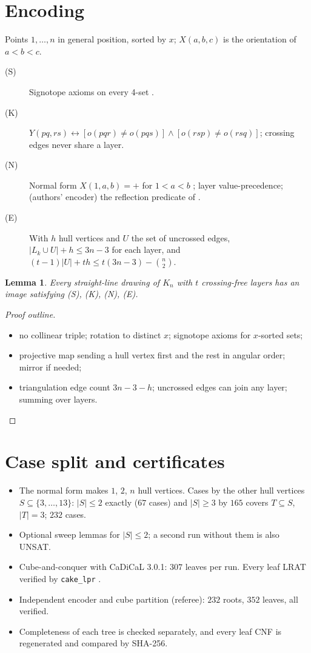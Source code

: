 \documentclass[11pt]{article}
\newtheorem{lemma}[theorem]{Lemma}
\begin{document}
\section{Encoding}
Points $1,\dots,n$ in general position, sorted by $x$; $X(a,b,c)$ is the orientation of $a<b<c$.
\begin{description}
\item[(S)] Signotope axioms on every 4-set \cite{FW,HS}.
\item[(K)] $Y(pq,rs)\leftrightarrow[o(pqr)\ne o(pqs)]\wedge[o(rsp)\ne o(rsq)]$; crossing edges never share a layer.
\item[(N)] Normal form $X(1,a,b)=+$ for $1<a<b$ \cite{HS}; layer value-precedence; (authors' encoder) the reflection
  predicate of \cite{HS}.
\item[(E)] With $h$ hull vertices and $U$ the set of uncrossed edges, $|L_k\cup U|+h\le 3n-3$ for each layer, and
  $(t-1)|U|+th\le t(3n-3)-\binom n2$.
\end{description}

\begin{lemma}\label{lem:sound}
Every straight-line drawing of $K_n$ with $t$ crossing-free layers has an image satisfying (S), (K), (N), (E).
\end{lemma}
\begin{proof}[Proof outline]
\begin{itemize}
\item no collinear triple; rotation to distinct $x$; signotope axioms for $x$-sorted sets;
\item projective map sending a hull vertex first and the rest in angular order; mirror if needed;
\item triangulation edge count $3n-3-h$; uncrossed edges can join any layer; summing over layers.
\end{itemize}
\end{proof}

\section{Case split and certificates}
\begin{itemize}
\item The normal form makes $1$, $2$, $n$ hull vertices. Cases by the other hull vertices $S\subseteq\{3,\dots,13\}$:
  $|S|\le 2$ exactly ($67$ cases) and $|S|\ge3$ by $165$ covers $T\subseteq S$, $|T|=3$; $232$ cases.
\item Optional sweep lemmas for $|S|\le 2$; a second run without them is also UNSAT.
\item Cube-and-conquer with CaDiCaL 3.0.1: $307$ leaves per run. Every leaf LRAT verified by \texttt{cake\_lpr}
  \cite{cake}.
\item Independent encoder and cube partition (referee): $232$ roots, $352$ leaves, all verified.
\item Completeness of each tree is checked separately, and every leaf CNF is regenerated and compared by SHA-256.
\end{itemize}
\end{document}
